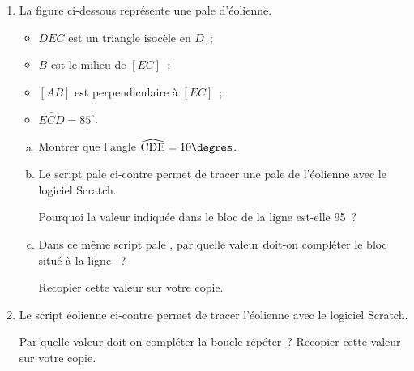 \documentclass{article}
\begin{document}
    \begin{minipage}[c]{.60\linewidth}
        \begin{enumerate}[1), font=\bfseries]
            \item La figure ci-dessous représente une pale d'éolienne.
            \begin{center}
            \end{center}
            \begin{itemize}
                \item $DEC$ est un triangle isocèle en $D$~;
                \item $B$ est le milieu de $[EC]$~;
                \item $[AB]$ est perpendiculaire à $[EC]$~; 
                \item $\widehat{ECD}= 85^\circ$.
            \end{itemize}
            \begin{enumerate}[a), font=\bfseries]
                \item Montrer que l'angle $\widehat{\text{CDE}} = 10\degres$.
                \item Le script \og pale \fg{} ci-contre permet de tracer une pale de l'éolienne avec le logiciel Scratch.\par                     
                Pourquoi la valeur indiquée dans le bloc de la ligne  est-elle 95~?
                \item Dans ce même script \og pale \fg{}, par quelle valeur doit-on compléter le bloc situé à la ligne ~? \par                     
                Recopier cette valeur sur votre copie.
            \end{enumerate}
            \item Le script \og éolienne \fg{} ci-contre permet de tracer l'éolienne avec le logiciel Scratch. \par                 
            Par quelle valeur doit-on compléter la boucle \og  répéter\fg{}~? Recopier cette valeur sur votre copie.                
        \end{enumerate}
    \end{minipage}\hfill
\end{document}

